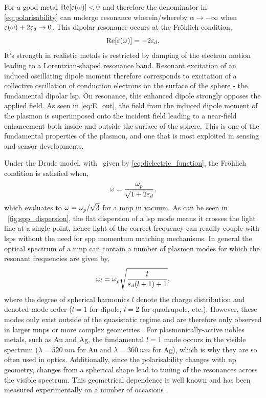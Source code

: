 \documentclass{article}
\begin{document}
For a good metal $\mathrm{Re}\!\left[{\varepsilon(\omega)}\right]<0$ and therefore the denominator in \eqref{eq:polarisability} can undergo resonance {\color{red}wherein/whereby} $\alpha\rightarrow-\infty$ when $\varepsilon(\omega)+2\varepsilon_d\rightarrow0$. This dipolar resonance occurs at the Fr\"{o}hlich condition,
\begin{equation}
\mathrm{Re}\!\left[{\varepsilon(\omega)}\right] = -2\varepsilon_d. \label{eq:frohlich}
\end{equation}
It's strength in realistic metals is restricted by damping of the electron motion leading to a Lorentzian-shaped resonance band.
Resonant excitation of an induced oscillating dipole moment therefore corresponds to excitation of a collective oscillation of conduction electrons on the surface of the sphere - the fundamental dipolar \gls{lsp}.
On resonance, this enhanced dipole strongly opposes the applied field. As seen in \eqref{eq:E_out}, the field from the induced dipole moment of the plasmon is superimposed onto the incident field leading to a near-field enhancement both inside and outside the surface of the sphere. This is one of the fundamental properties of the plasmon, and one that is most exploited in sensing and sensor developments.

Under the Drude model, with \dielectric\ given by \eqref{eq:dielectric_function}, the Fr\"{o}hlich condition is satisfied when,
\begin{equation}
\omega = \frac{\omega_{p}^{}}{\sqrt{1+2\varepsilon_d}},
\end{equation}
which evaluates to $\omega = \omega_{p}^{}/\sqrt{3}$ for a \gls{mnp} in vacuum. As can be seen in \figurename~\ref{fig:spp_dispersion}, the flat dispersion of a \gls{lsp} mode means it crosses the light line at a single point, hence light of the correct frequency can readily couple with \glspl{lsp} without the need for \gls{spp} momentum matching mechanisms.
In general the optical spectrum of a \gls{mnp} can contain a number of plasmon modes for which the resonant frequencies are given by,
\begin{equation}
\omega_l = \omega_{p}^{}\sqrt{\frac{l}{\varepsilon_d(l+1)+1}},
\end{equation}
where the degree of spherical harmonics $l$ denote the charge distribution and denoted mode order ($l=1$ for dipole, $l=2$ for quadrupole, etc.). However, these modes only exist outside of the quasistatic regime and are therefore only observed in larger \glspl{mnp} \cite{} or more complex geometries \cite{}.
For plasmonically-active nobles metals, such as Au and Ag, the fundamental $l=1$ mode occurs in the visible spectrum ($\lambda=\SI{520}{nm}$ for Au and $\lambda=\SI{360}{nm}$ for Ag), which is why they are so often used in optics.
Additionally, since the polarisability changes with \gls{np} geometry, changes from a spherical shape lead to tuning of the resonances across the visible spectrum. This geometrical dependence is well known and has been measured experimentally on a number of occasions \cite{mock2002, kuwata2003}.
\end{document}
